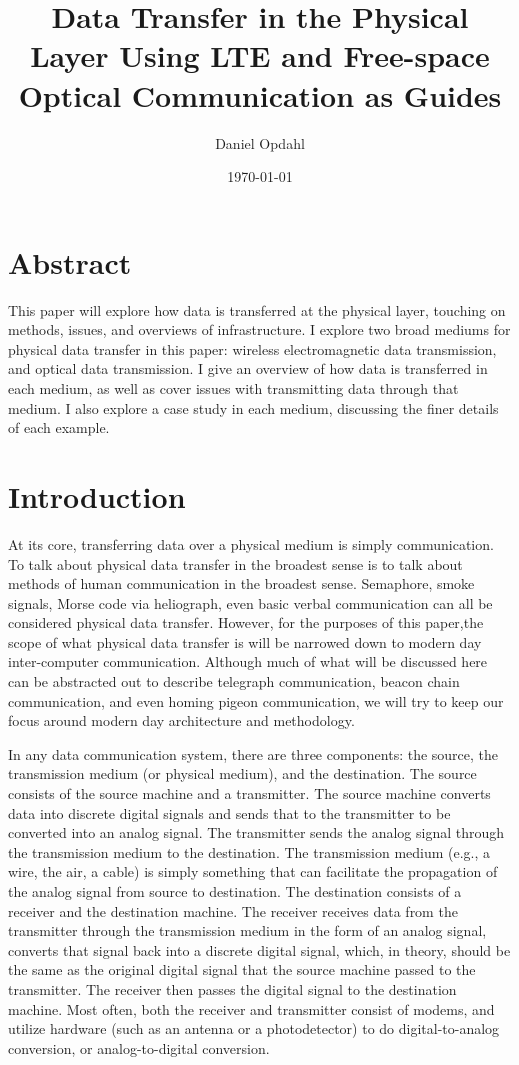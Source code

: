 \documentclass[11pt]{article}
\title{Data Transfer in the Physical Layer Using LTE and Free-space Optical Communication as Guides}
\author{Daniel Opdahl}
\date{\today}
\begin{document}
\maketitle

\section{Abstract}

This paper will explore how data is transferred at the physical layer, touching on methods, issues, and overviews of infrastructure. I explore two broad mediums for physical data transfer in this paper: wireless electromagnetic data transmission, and optical data transmission. I give an overview of how data is transferred in each medium, as well as cover issues with transmitting data through that medium. I also explore a case study in each medium, discussing the finer details of each example.

\section{Introduction}

At its core, transferring data over a physical medium is simply communication. To talk about physical data transfer in the broadest sense is to talk about methods of human communication in the broadest sense. Semaphore, smoke signals, Morse code via heliograph, even basic verbal communication can all be considered physical data transfer. However, for the purposes of this paper,the scope of what physical data transfer is will be narrowed down to modern day inter-computer communication. Although much of what will be discussed here can be abstracted out to describe telegraph communication, beacon chain communication, and even homing pigeon communication, we will try to keep our focus around modern day architecture and methodology. 

In any data communication system, there are three components: the source, the transmission medium (or physical medium), and the destination. The source consists of the source machine and a transmitter. The source machine converts data into discrete digital signals and sends that to the transmitter to be converted into an analog signal. The transmitter sends the analog signal through the transmission medium to the destination. The transmission medium (e.g., a wire, the air, a cable) is simply something that can facilitate the propagation of the analog signal from source to destination. The destination consists of a receiver and the destination machine. The receiver receives data from the transmitter through the transmission medium in the form of an analog signal, converts that signal back into a discrete digital signal, which, in theory, should be the same as the original digital signal that the source machine passed to the transmitter. The receiver then passes the digital signal to the destination machine. Most often, both the receiver and transmitter consist of modems, and utilize hardware (such as an antenna or a photodetector) to do digital-to-analog conversion, or analog-to-digital conversion.
\end{document}
